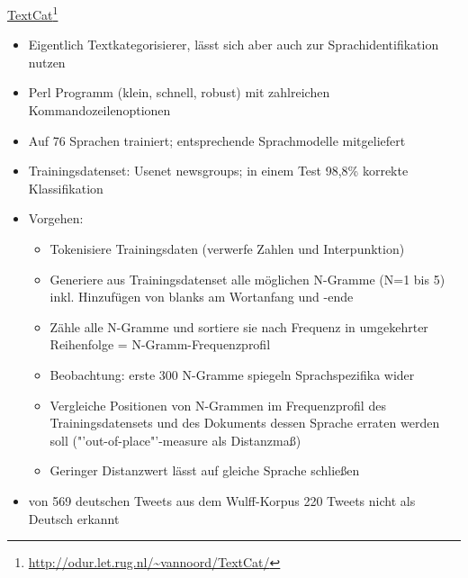 \documentclass[11pt]{article}
\begin{document}
\underline{TextCat}\footnote{\url{http://odur.let.rug.nl/~vannoord/TextCat/}} \newline
\begin{itemize}
\item Eigentlich Textkategorisierer, lässt sich aber auch zur Sprachidentifikation nutzen
\item Perl Programm (klein, schnell, robust) mit zahlreichen Kommandozeilenoptionen
\item Auf 76 Sprachen trainiert; entsprechende Sprachmodelle mitgeliefert
\item Trainingsdatenset: Usenet newsgroups; in einem Test 98,8\% korrekte Klassifikation
\item Vorgehen: 
\begin{itemize}
\item Tokenisiere Trainingsdaten (verwerfe Zahlen und Interpunktion) 
\item Generiere aus Trainingsdatenset alle möglichen N-Gramme (N=1 bis 5) inkl. Hinzufügen von blanks am Wortanfang und -ende
\item Zähle alle N-Gramme und sortiere sie nach Frequenz in umgekehrter Reihenfolge = N-Gramm-Frequenzprofil
\item Beobachtung: erste 300 N-Gramme spiegeln Sprachspezifika wider
\item Vergleiche Positionen von N-Grammen im Frequenzprofil des Trainingsdatensets und des Dokuments dessen Sprache erraten werden soll ("'out-of-place"'-measure als Distanzmaß) 
\item Geringer Distanzwert lässt auf gleiche Sprache schließen
\end{itemize}
\item von 569 deutschen Tweets aus dem Wulff-Korpus 220 Tweets nicht als Deutsch erkannt \newline
\end{itemize}
\end{document}
